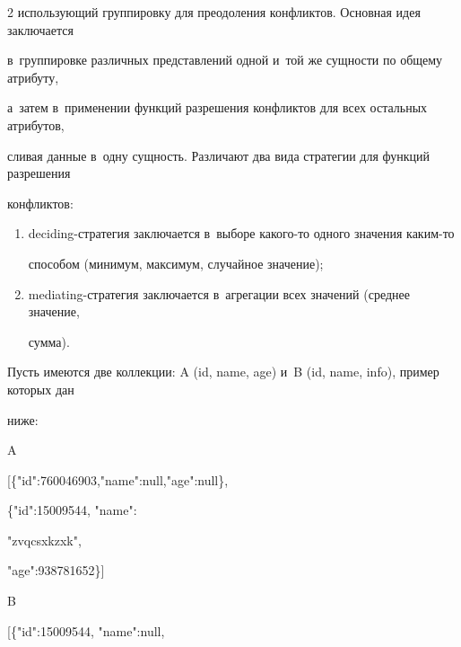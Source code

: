\begin{multicols}{2}
использующий группировку для преодоления конфликтов. Основная идея заключается

в~группировке различных представлений одной и~той же сущности по общему атрибуту,

а~затем в~применении функций разрешения конфликтов для всех остальных атрибутов,

сливая данные в~одну сущность. Различают два вида стратегии для функций разрешения

конфликтов:

  \begin{enumerate}[(1)]

\item deciding-стратегия заключается в~выборе ка\-ко\-го-то одного значения каким-то

способом (минимум, максимум, случайное значение);

\item mediating-стратегия заключается в~агрегации всех значений (среднее значение,

сумма).

\end{enumerate}



  Пусть имеются две коллекции: A (id, name, age) и~B (id, name, info), пример которых дан

ниже:



{\sf

\noindent

  A



\noindent

  [\{"id":760046903,"name":null,"age":null\},



\noindent

  \{"id":15009544, "name":

"zvqcsxkzxk",



\noindent

"age":938781652\}]



  \vspace*{6pt}



\noindent

  B



\noindent

  [\{"id":15009544, "name":null,

}
\end{multicols}

